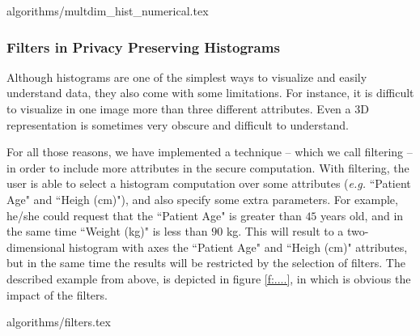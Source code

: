 {algorithms/multdim_hist_numerical.tex}



\subsubsection{Filters in Privacy Preserving Histograms}\label{sss:histogram-filters}
Although histograms are one of the simplest ways to visualize and easily understand data, they also come with some limitations.
For instance, it is difficult to visualize in one image more than three different attributes.
Even a 3D representation is sometimes very obscure and difficult to understand.

For all those reasons, we have implemented a technique -- which we call filtering -- in order to include more attributes in the secure computation.
With filtering, the user is able to select a histogram computation over some attributes (\textit{e.g.} ``Patient Age" and ``Heigh (cm)"), and also specify some extra parameters.
For example, he/she could request that the ``Patient Age" is greater than $45$ years old, and in the same time ``Weight (kg)" is less than $90$ kg.
This will result to a two-dimensional histogram with axes the ``Patient Age" and ``Heigh (cm)" attributes, but in the same time the results will be restricted by the selection of filters.
The described example from above, is depicted in figure \ref{f:....}, in which is obvious the impact of the filters.


{algorithms/filters.tex}








